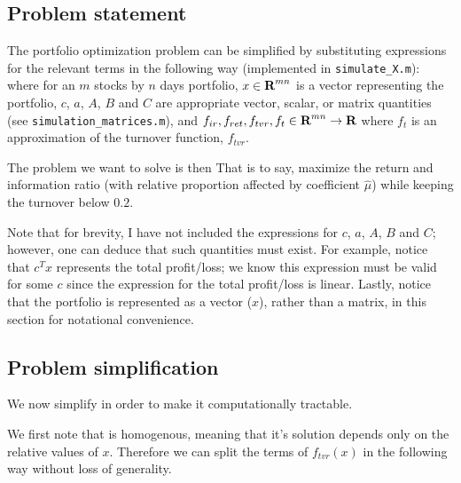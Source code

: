 \documentclass{article}
\begin{document}
\subsection{Problem statement}
    The portfolio optimization problem can be simplified 
        by substituting expressions for the relevant terms in the following way
        (implemented in \verb+simulate_X.m+):
    where for an $m$ stocks by $n$ days portfolio,
        \BI $x \in {\mbox{\bf R}}^{mn}$ is a vector representing the portfolio,
        \I  $c$, $a$, $A$, $B$ and $C$ are appropriate vector, scalar, 
            or matrix quantities (see \verb+simulation_matrices.m+), and
        \I  $f_{ir}, f_{ret}, f_{tvr}, f_{t} \in {\mbox{\bf R}}^{mn} \to {\mbox{\bf R}}$
            where $f_{t}$ is an approximation of the turnover function, 
            $f_{tvr}$. \EI

    The problem we want to solve is then
    That is to say, maximize the return and information ratio
        (with relative proportion affected by coefficient $\hat{\mu}$)
        while keeping the turnover below $0.2$.


    Note that for brevity, I have not included the expressions for 
        $c$, $a$, $A$, $B$ and $C$; 
        however, one can deduce that such quantities must exist.
    For example, notice that $c^T x$ represents the total profit/loss;
        we know this expression must be valid for some $c$ 
        since the expression for the total profit/loss is linear.
    Lastly, notice that the portfolio is represented as a vector ($x$),
        rather than a matrix, in this section for notational convenience.

\subsection{Problem simplification}
    We now simplify  in order 
        to make it computationally tractable.

    We first note that  is homogenous,
        meaning that it's solution depends only on the relative values of $x$.
    Therefore we can split the terms of $f_{tvr}(x)$ in the following way
        without loss of generality.
\end{document}
